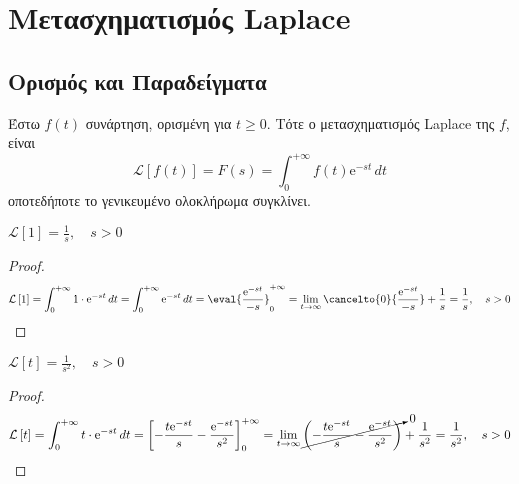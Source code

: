 \documentclass[a4paper,table]{report}
\begin{document}
\chapter*{Μετασχηματισμός Laplace}

\vspace{\baselineskip}


\section*{Ορισμός και Παραδείγματα}

\begin{mybox1}
\begin{dfn}
  Έστω $ f(t) $ συνάρτηση, ορισμένη για $ t \geq 0 $. Τότε ο μετασχηματισμός Laplace 
  της $f$, είναι
  \begin{equation}\label{eq:laplace}
    \mathcal{L} \left[f(t)\right] = F(s) = \int _{0}^{+\infty} f(t) 
    \mathrm{e}^{-st} \,{dt}
  \end{equation} 
  οποτεδήποτε το γενικευμένο ολοκλήρωμα συγκλίνει.
\end{dfn}
\end{mybox1}

\begin{mybox3}
\begin{example}
  $ {\mathcal{L}\left[1\right] = \frac{1}{s}, \quad s > 0} $
\end{example}
\end{mybox3}
\begin{proof}
  \[
    \mathcal{L}\left[1\right] = \int_{0}^{+\infty} 1\cdot \mathrm{e}^{-st} \,{dt} =  
    \int_{0}^{+\infty} \mathrm{e}^{-st} \,{dt} = \eval{\frac{\mathrm{e}^{-st}}{-s}}
    _{0}^{+\infty} = \lim_{t \to \infty} \cancelto{0}{\frac{\mathrm{e}^{-st}}{-s}} 
    + \frac{1}{s} = \frac{1}{s} , \quad s>0 
  \] 
\end{proof}

\begin{mybox3}
\begin{example}
  $ {\mathcal{L}\left[t\right] = \frac{1}{s^{2}}, \quad s>0} $
\end{example}
\end{mybox3}
\begin{proof}
  \[
    \mathcal{L}\left[t\right] = \int_{0}^{+\infty} t \cdot \mathrm{e}^{-st} \,{dt} = 
    \left[-\frac{t \mathrm{e}^{-st}}{s} - \frac{\mathrm{e}^{-st}}{s^{2}}\right]
    _{0}^{+\infty} = \lim_{t \to \infty} 
    \cancelto{0}{\left(- \frac{t\mathrm{e}^{-st}}{s} -
    \frac{\mathrm{e}^{-st}}{s^{2}}\right)} + \frac{1}{s^{2}} = \frac{1}{s^{2}} , 
    \quad s>0
  \] 
\end{proof}
\end{document}
